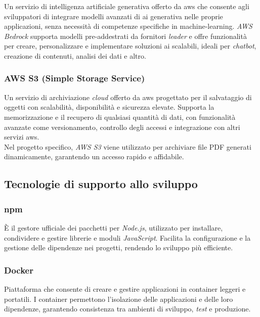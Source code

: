 Un servizio di intelligenza artificiale generativa offerto da \gls{aws} che consente agli sviluppatori di integrare modelli avanzati di \gls{ai} generativa nelle proprie applicazioni, senza necessità di competenze specifiche in \gls{machine-learning}. 
\textit{AWS Bedrock} supporta modelli pre-addestrati da fornitori \textit{leader} e offre funzionalità per creare, personalizzare e implementare soluzioni \gls{ai} scalabili, ideali per \textit{chatbot}, creazione di contenuti, analisi dei dati e altro.


\subsubsection{AWS S3 (Simple Storage Service)}

Un servizio di archiviazione \textit{cloud} offerto da \gls{aws} progettato per il salvataggio di oggetti con scalabilità, disponibilità e sicurezza elevate. Supporta la memorizzazione e il recupero di qualsiasi quantità di dati, con funzionalità avanzate come versionamento, controllo degli accessi e integrazione con altri servizi \gls{aws}. \\
Nel progetto specifico, \textit{AWS S3} viene utilizzato per archiviare file PDF generati dinamicamente, garantendo un accesso rapido e affidabile.


\pagebreak
\subsection{Tecnologie di supporto allo sviluppo}
\label{sez:tecnologie-supporto-sviluppo}

\subsubsection{\gls{npm}}

È il gestore ufficiale dei pacchetti per \textit{Node.js}, utilizzato per installare, condividere e gestire librerie e moduli \textit{JavaScript}. 
Facilita la configurazione e la gestione delle dipendenze nei progetti, rendendo lo sviluppo più efficiente.

\subsubsection{Docker}

Piattaforma che consente di creare e gestire applicazioni in \gls{container} leggeri e portatili.
I \gls{container} permettono l’isolazione delle applicazioni e delle loro dipendenze, garantendo consistenza tra ambienti di sviluppo, \textit{test} e produzione.

